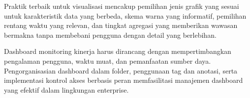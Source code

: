 Praktik terbaik untuk visualisasi mencakup pemilihan jenis grafik yang sesuai untuk karakteristik data yang berbeda, skema warna yang informatif, pemilihan rentang waktu yang relevan, dan tingkat agregasi yang memberikan wawasan bermakna tanpa membebani pengguna dengan detail yang berlebihan.

Dashboard monitoring kinerja harus dirancang dengan mempertimbangkan pengalaman pengguna, waktu muat, dan pemanfaatan sumber daya. Pengorganisasian dashboard dalam folder, penggunaan tag dan anotasi, serta implementasi kontrol akses berbasis peran memfasilitasi manajemen dashboard yang efektif dalam lingkungan enterprise.